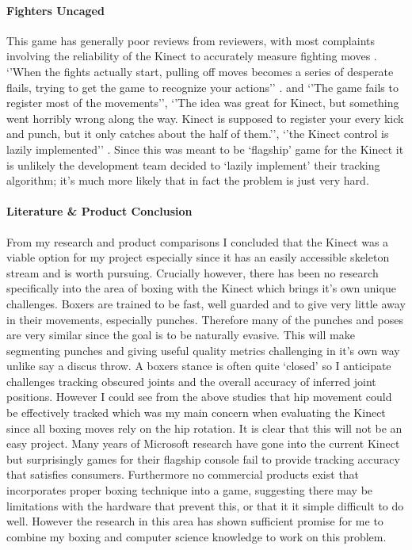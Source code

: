 \paragraph{Fighters Uncaged}
This game has generally poor reviews from reviewers, with most complaints involving the reliability of the Kinect to accurately measure fighting moves \cite{gamerev1}.  `'When the fights actually start, pulling off moves becomes a series of desperate flails, trying to get the game to recognize your actions'' \cite{gamerev2} .
and `'The game fails to register most of the movements'', `'The idea was great for Kinect, but something went horribly wrong along the way. Kinect is supposed to register your every kick and punch, but it only catches about the half of them.'', `'the Kinect control is lazily implemented'' \cite{gamerev3}.\newline
Since this was meant to be `flagship' game for the Kinect it is unlikely the development team decided to `lazily implement' their tracking algorithm; it's much more likely that in fact the problem is just very hard.

\paragraph{Literature \& Product Conclusion}
From my research and product comparisons I concluded that the Kinect was a viable option for my project especially since it has an easily accessible skeleton stream and is worth pursuing. Crucially however, there has been no research specifically into the area of boxing with the Kinect which brings it's own unique challenges. Boxers are trained to be fast, well guarded and to give very little away in their movements, especially punches. Therefore many of the punches and poses are very similar since the goal is to be naturally evasive. This will make segmenting punches and giving useful quality metrics challenging in it's own way unlike say a discus throw. A boxers stance is often quite `closed' so I anticipate challenges tracking obscured joints and the overall accuracy of inferred joint positions. However I could see from the above studies that hip movement could be effectively tracked which was my main concern when evaluating the Kinect since all boxing moves rely on the hip rotation.
\newline\newline 
It is clear that this will not be an easy project. Many years of Microsoft research have gone into the current Kinect but surprisingly games for their flagship console fail to provide tracking accuracy that satisfies consumers. Furthermore no commercial products exist that incorporates proper boxing technique into a game, suggesting there may be limitations with the hardware that prevent this, or that it it simple difficult to do well. However the research in this area has shown sufficient promise for me to combine my boxing and computer science knowledge to work on this problem.\clearpage

